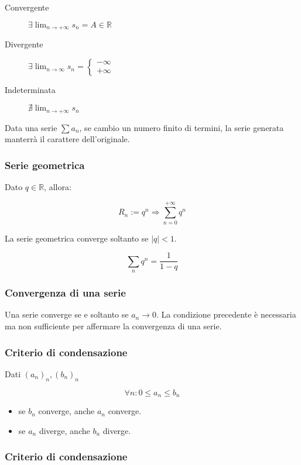 \documentclass{subfiles}
\begin{document}
\begin{description}
    \item[Convergente] $\exists \lim_{n \to +\infty} s_n = A \in \mathbb{R}$
    \item[Divergente] $\exists \lim_{n \to \infty} s_n = \begin{cases} -\infty\\ +\infty\end{cases}$
    \item[Indeterminata] $\nexists  \lim_{n \to +\infty} s_n$
\end{description}

\noindent
Data una serie $\sum a_n$, se cambio un numero finito di termini, la serie generata manterrà il carattere dell'originale.

\subsubsection{Serie geometrica}

Dato $q \in \mathbb{R}$, allora:

$$
R_n := q^n \Rightarrow \sum_{n = 0}^{+\infty} q^n
$$

\noindent
La serie geometrica converge soltanto se $|q| < 1$.

$$
\sum_{n} q^n = \frac{1}{1 - q}
$$

\subsubsection{Convergenza di una serie}

Una serie converge se e soltanto se $a_n \to 0$. La condizione precedente è necessaria ma non sufficiente per affermare la convergenza di una serie.

\subsubsection{Criterio di condensazione}

Dati $(a_n)_n, (b_n)_n$

$$
\forall n : 0 \leq a_n \leq b_n
$$

\begin{itemize}
    \item se $b_n$ converge, anche $a_n$ converge.
    \item se $a_n$ diverge, anche $b_n$ diverge.
\end{itemize}

\subsubsection{Criterio di condensazione}
\end{document}
